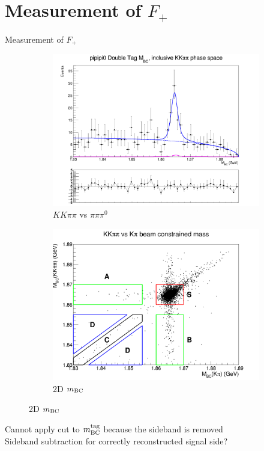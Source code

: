 \documentclass{beamer}
\begin{document}
\section{Measurement of \texorpdfstring{$F_+$}{F+}}
\begin{frame}{Measurement of $F_+$}
  \begin{figure}
    \centering
    \begin{subfigure}{0.38\textwidth}
      \centering
      \includegraphics[width=\textwidth]{Plots/DoubleTagYield_DoubleTag_CP_KKpipi_vs_pipipi0_SignalBin0.png}
      \caption{$KK\pi\pi$ vs $\pi\pi\pi^0$}
    \end{subfigure}%
    \begin{subfigure}{0.38\textwidth}
      \centering
      \includegraphics[width=\textwidth]{Plots/KpiDoubleTagYield.png}
      \caption{2D $m_{\rm BC}$}
    \end{subfigure}
  \end{figure}
  \begin{center}
    Cannot apply cut to $m_{\rm BC}^{\rm tag}$ because the sideband is removed \\
    Sideband subtraction for correctly reconstructed signal side?
  \end{center}
\end{frame}
\end{document}
